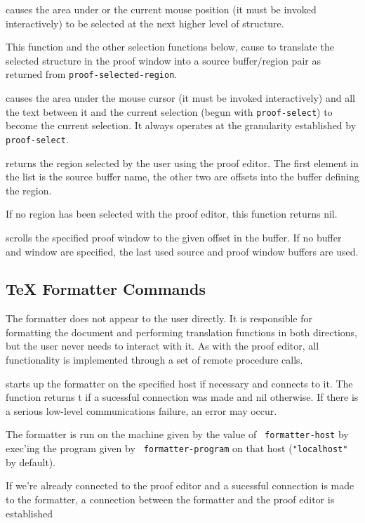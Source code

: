 %
causes the area under or the current mouse position (it must be
invoked interactively) to be selected at the next higher level of
structure.

This function and the other selection functions below, cause {\VorTeX}
to translate the selected structure in the proof window into a source
buffer/region pair as returned from {\tt proof-selected-region}.

%
causes the area under the mouse cursor (it must be invoked
interactively) and all the text between it and the current selection
(begun with {\tt proof-select}) to become the current selection.
It always operates at the granularity established by {\tt proof-select}.

%
returns the region selected by the user using the proof editor.  The
first element in the list is the source buffer name, the other two are
offsets into the buffer defining the region.

If no region has been selected with the proof editor, this function
returns nil.

%
scrolls the specified proof window to the given offset in the buffer.
If no buffer and window are specified, the last used source and proof
window buffers are used.


\subsection{{\TeX} Formatter Commands}

The formatter does not appear to the user directly.  It is responsible
for formatting the document and performing translation functions in
both directions, but the user never needs to interact with it.  As with
the proof editor, all functionality is implemented through a set of
remote procedure calls.

%
starts up the formatter on the specified host if necessary and
connects to it.  The function returns t if a sucessful connection was
made and nil otherwise.  If there is a serious low-level
communications failure, an error may occur.

The formatter is run on the machine given by the value of {\tt
formatter-host} by exec'ing the program given by {\tt
formatter-program} on that host ({\tt "localhost"} by default).

If we're already connected to the proof editor and a sucessful
connection is made to the formatter, a connection between the
formatter and the proof editor is established

